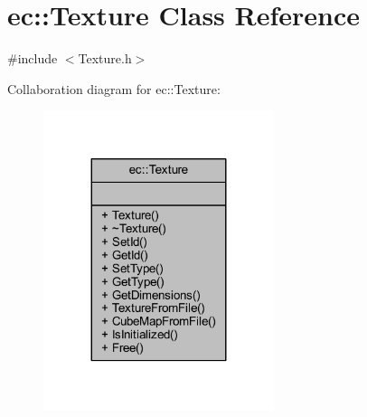 \hypertarget{classec_1_1_texture}{}\section{ec\+:\+:Texture Class Reference}
\label{classec_1_1_texture}


{\ttfamily \#include $<$Texture.\+h$>$}



Collaboration diagram for ec\+:\+:Texture\+:
\nopagebreak
\begin{figure}[H]
\begin{center}
\leavevmode
\includegraphics[width=191pt]{classec_1_1_texture__coll__graph}
\end{center}
\end{figure}

